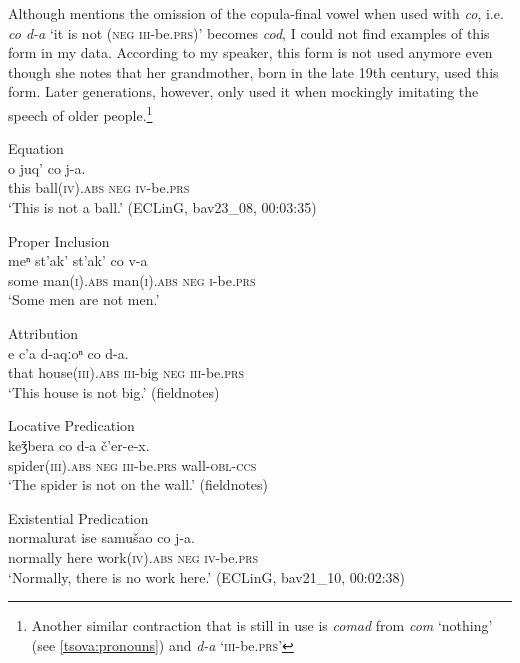 \documentclass[output=paper,%
colorlinks,citecolor=brown,
showindex
]{langscibook}
\begin{document}
Although \citet[63]{Schiefner1856} mentions the omission of the copula-final vowel when used with \textit{co}, i.e. \textit{co d-a} `it is not (\textsc{neg} \textsc{iii}-be.\textsc{prs})' becomes \textit{cod}, I could not find examples of this form in my data. According to my speaker, this form is not used anymore even though she notes that her grandmother, born in the late 19th century, used this form. Later generations, however, only used it when mockingly imitating the speech of older people.\footnote{Another similar contraction that is still in use is \textit{comad} from \textit{com} `nothing' (see \ref{tsova:pronouns}) and \textit{d-a} `\textsc{iii}-be.\textsc{prs}'}

\ea	\label{tsova:ball}
Equation\\
\gll 	o	juq’	co	j-a.\\  
	this ball(\textsc{iv}).\textsc{abs} \textsc{neg} \textsc{iv}-be.\textsc{prs}\\
\glt `This is not a ball.' (ECLinG, bav23\_08, 00:03:35)
\z

\ea	\label{tsova:somemen}
Proper Inclusion\\
\gll 	meⁿ st'ak' st'ak' co v-a\\  
	some man\textsc{(i).abs} man\textsc{(i).abs} \textsc{neg} \textsc{i}-be\textsc{.prs}\\
\glt `Some men are not men.' \citep[147]{BertlaniEtAl2013} 
\z

\ea	\label{tsova:bighouse}
Attribution\\
\gll 	e c'a d-aqːoⁿ co d-a.\\  
	that house\textsc{(iii).abs} \textsc{iii}-big \textsc{neg} \textsc{iii}-be\textsc{.prs}\\
\glt `This house is not big.' (fieldnotes)
\z

\ea	\label{tsova:spider}
Locative Predication\\
\gll 	keǯbera co d-a č’er-e-x.\\  
	spider(\textsc{iii}).\textsc{abs} \textsc{neg} \textsc{iii}-be.\textsc{prs} wall-\textsc{obl-ccs}\\
\glt `The spider is not on the wall.' (fieldnotes)
\z

\ea	\label{tsova:nowork}
Existential Predication\\
\gll 	normalurat	ise	samušao	co	j-a.\\  
	normally here work(\textsc{iv}).\textsc{abs} \textsc{neg} \textsc{iv}-be.\textsc{prs}\\
\glt `Normally, there is no work here.' (ECLinG, bav21\_10, 00:02:38)
\z
\end{document}
